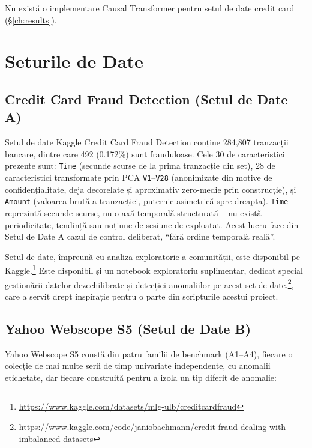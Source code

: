 Nu există o implementare Causal Transformer pentru setul de date credit card (\S\ref{ch:results}).

\section{Seturile de Date}
\label{sec:datasets-overview}

\subsection{Credit Card Fraud Detection (Setul de Date A)}

Setul de date Kaggle Credit Card Fraud Detection conține 284{,}807 tranzacții bancare, dintre care 492 (0.172\%) sunt frauduloase.
Cele 30 de caracteristici prezente sunt: \texttt{Time} (secunde scurse de la prima tranzacție din set), 28 de caracteristici transformate prin PCA \texttt{V1}--\texttt{V28} (anonimizate din motive de confidențialitate, deja decorelate și aproximativ zero-medie prin construcție), și \texttt{Amount} (valoarea brută a tranzacției, puternic asimetrică spre dreapta).
\texttt{Time} reprezintă secunde scurse, nu o axă temporală structurată -- nu există periodicitate, tendință sau noțiune de sesiune de exploatat. Acest lucru face din Setul de Date A cazul de control deliberat, \enquote{fără ordine temporală reală}.

Setul de date, împreună cu analiza exploratorie a comunității, este disponibil pe Kaggle.\footnote{\url{https://www.kaggle.com/datasets/mlg-ulb/creditcardfraud}} Este disponibil și un notebook exploratoriu suplimentar, dedicat special gestionării datelor dezechilibrate și detecției anomaliilor pe acest set de date.\footnote{\url{https://www.kaggle.com/code/janiobachmann/credit-fraud-dealing-with-imbalanced-datasets}}, care a servit drept inspirație pentru o parte din scripturile acestui proiect.

\subsection{Yahoo Webscope S5 (Setul de Date B)}

Yahoo Webscope S5 constă din patru familii de benchmark (A1--A4), fiecare o colecție de mai multe serii de timp univariate independente, cu anomalii etichetate, dar fiecare construită pentru a izola un tip diferit de anomalie:

